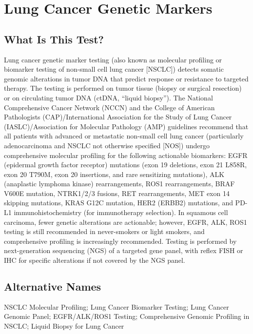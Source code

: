 \chapter{Lung Cancer Genetic Markers}

\section*{What Is This Test?}
Lung cancer genetic marker testing (also known as molecular profiling or biomarker testing of non-small cell lung cancer [NSCLC]) detects somatic genomic alterations in tumor DNA that predict response or resistance to targeted therapy. The testing is performed on tumor tissue (biopsy or surgical resection) or on circulating tumor DNA (ctDNA, ``liquid biopsy''). The National Comprehensive Cancer Network (NCCN) and the College of American Pathologists (CAP)/International Association for the Study of Lung Cancer (IASLC)/Association for Molecular Pathology (AMP) guidelines recommend that all patients with advanced or metastatic non-small cell lung cancer (particularly adenocarcinoma and NSCLC not otherwise specified [NOS]) undergo comprehensive molecular profiling for the following actionable biomarkers: EGFR (epidermal growth factor receptor) mutations (exon 19 deletions, exon 21 L858R, exon 20 T790M, exon 20 insertions, and rare sensitizing mutations), ALK (anaplastic lymphoma kinase) rearrangements, ROS1 rearrangements, BRAF V600E mutation, NTRK1/2/3 fusions, RET rearrangements, MET exon 14 skipping mutations, KRAS G12C mutation, HER2 (ERBB2) mutations, and PD-L1 immunohistochemistry (for immunotherapy selection). In squamous cell carcinoma, fewer genetic alterations are actionable; however, EGFR, ALK, ROS1 testing is still recommended in never-smokers or light smokers, and comprehensive profiling is increasingly recommended. Testing is performed by next-generation sequencing (NGS) of a targeted gene panel, with reflex FISH or IHC for specific alterations if not covered by the NGS panel.

\section*{Alternative Names}
NSCLC Molecular Profiling; Lung Cancer Biomarker Testing; Lung Cancer Genomic Panel; EGFR/ALK/ROS1 Testing; Comprehensive Genomic Profiling in NSCLC; Liquid Biopsy for Lung Cancer


